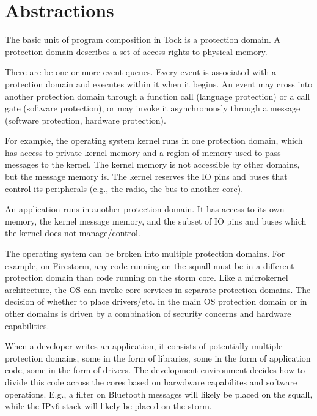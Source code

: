 \section{Abstractions}

The basic unit of program composition in Tock is a protection domain. A
protection domain describes a set of access rights to physical memory. 

There are be one or more event queues. Every event is associated with
a protection domain and executes within it when it begins. An event
may cross into another protection domain through a function call
(language protection) or a call gate (software protection), or
may invoke it asynchronously through a message (software protection,
hardware protection).

For example, the operating system kernel runs in one protection domain,
which has access to private kernel memory and a region of memory used to
pass messages to the kernel. The kernel memory is not accessible by other
domains, but the message memory is. The kernel reserves the IO pins and buses
that control its peripherals (e.g., the radio, the bus to another core). 

An application runs in another protection domain. It has access to its own
memory, the kernel message memory, and the subset of IO pins and buses
which the kernel does not manage/control.

The operating system can be broken into multiple protection domains. For
example, on Firestorm, any code running on the squall must be in a different
protection domain than code running on the storm core. Like a microkernel
architecture, the OS can invoke core services in separate protection domains.
The decision of whether to place drivers/etc. in the main OS protection domain
or in other domains is driven by a combination of security concerns and 
hardware capabilities.

When a developer writes an application, it consists of potentially multiple
protection domains, some in the form of libraries, some in the form of
application code, some in the form of drivers. The development environment
decides how to divide this code across the cores based on harwdware capabilites
and software operations. E.g., a filter on Bluetooth messages will likely be 
placed on the squall, while the IPv6 stack will likely be placed on the storm.
